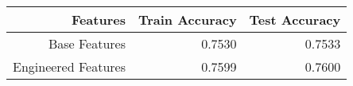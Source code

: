 \begin{tabular}{|r||r|r|}
\hline
Features & Train Accuracy & Test Accuracy \\
\hline
Base Features & 0.7530 & 0.7533 \\
Engineered Features & 0.7599 & 0.7600 \\
\hline
\end{tabular}
